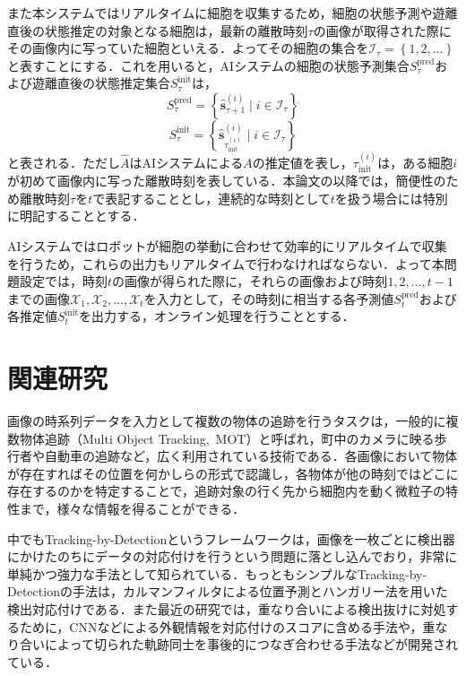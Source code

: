 また本システムではリアルタイムに細胞を収集するため，細胞の状態予測や遊離直後の状態推定の対象となる細胞は，最新の離散時刻$\tau$の画像が取得された際にその画像内に写っていた細胞といえる．よってその細胞の集合を$\mathcal{I}_\tau = \left\{1, 2, \dots\right\}$と表すことにする．これを用いると，AIシステムの細胞の状態予測集合$S^{\text{pred}}_{\tau}$および遊離直後の状態推定集合$S^{\text{init}}_{\tau}$は，
\begin{equation}
    \label{eq:cell_state_prediction}
    S^{\text{pred}}_{\tau} = \left\{\hat{\bm{s}}_{\tau + 1}^{(i)} \mid i \in \mathcal{I}_{\tau}\right\}
\end{equation}
\begin{equation}
    \label{eq:cell_initial_state_prediction}
    S^{\text{init}}_{\tau} = \left\{\hat{\bm{s}}_{\tau_{\text{init}}^{(i)}}^{(i)} \mid i \in \mathcal{I}_{\tau}\right\}
\end{equation}
と表される．ただし$\hat{A}$はAIシステムによる$A$の推定値を表し，$\tau_{\text{init}}^{(i)}$は，ある細胞$i$が初めて画像内に写った離散時刻を表している．本論文の以降では，簡便性のため離散時刻$\tau$を$t$で表記することとし，連続的な時刻として$t$を扱う場合には特別に明記することとする．

AIシステムではロボットが細胞の挙動に合わせて効率的にリアルタイムで収集を行うため，これらの出力もリアルタイムで行わなければならない．よって本問題設定では，時刻$t$の画像が得られた際に，それらの画像および時刻$1,2,\dots, t-1$までの画像$\mathcal{X}_1, \mathcal{X}_2, \dots, \mathcal{X}_t$を入力として，その時刻に相当する各予測値$S_t^{\text{pred}}$および各推定値$S_t^{\text{init}}$を出力する，オンライン処理を行うこととする．

\section{関連研究}
\label{sec:related_works}

画像の時系列データを入力として複数の物体の追跡を行うタスクは，一般的に複数物体追跡（Multi Object Tracking,\ MOT）\cite{luo2021multiple}と呼ばれ，町中のカメラに映る歩行者や自動車の追跡など，広く利用されている技術である\cite{milan2016mot16,dendorfer2020mot20}．各画像において物体が存在すればその位置を何かしらの形式で認識し，各物体が他の時刻ではどこに存在するのかを特定することで，追跡対象の行く先から細胞内を動く微粒子の特性まで，様々な情報を得ることができる．

中でもTracking-by-Detectionというフレームワークは，画像を一枚ごとに検出器にかけたのちにデータの対応付けを行うという問題に落とし込んでおり，非常に単純かつ強力な手法として知られている．もっともシンプルなTracking-by-Detectionの手法は，カルマンフィルタによる位置予測とハンガリー法を用いた検出対応付けである．また最近の研究では，重なり合いによる検出抜けに対処するために，CNN\cite{Goodfellow-et-al-2016,lecun1998gradient}などによる外観情報を対応付けのスコアに含める手法\cite{wojke2017simple,du2023strongsort}や，重なり合いによって切られた軌跡同士を事後的につなぎ合わせる手法\cite{zhang2022bytetrack}などが開発されている．

